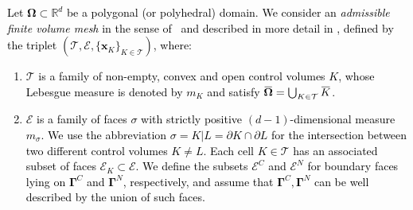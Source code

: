 \documentclass[10pt,a4paper, final]{article}
\newcommand{\reviewerTwo}[1]{\textcolor{black}{#1}}
\newcommand{\overbar}[1]{\mkern 1.5mu\overline{\mkern-1.5mu#1\mkern-1.5mu}\mkern 1.5mu}
\theoremstyle{definition}								%
\numberwithin{equation}{section}
\numberwithin{figure}{section}
\numberwithin{theorem}{section}
\begin{document}
\reviewerTwo{
    Let $\mathbf{\Omega} \subset \mathbb{R}^d$ be a polygonal (or polyhedral) domain. We consider an \emph{admissible finite volume mesh} in the sense of~\cite{Eymard.2000} and described in more detail in \cite{Abdel2024Thesis, Abdel2023Existence}, defined by the triplet $(\mathcal{T}, \mathcal{E}, \{\mathbf{x}_K\}_{K \in \mathcal{T}})$, where:
    \begin{enumerate}
        \item $\mathcal{T}$ is a family of non-empty, convex and open control volumes $K$, whose Lebesgue measure is denoted by $m_K$ and satisfy $ \mathbf{\overbar{\Omega}} = \bigcup_{K \in \mathcal{T}} \overbar{K}$.
        \item $\mathcal{E}$ is a family of faces $\sigma$ with strictly positive $(d-1)$-dimensional measure $m_\sigma $.
        We use the abbreviation $\sigma = K | L = \partial K \cap \partial L$ for the intersection between two different control volumes $K \neq L$.
        Each cell $K \in \mathcal{T}$ has an associated subset of faces $\mathcal{E}_K \subset \mathcal{E}$.
        We define the subsets $\mathcal{E}^C$ and $\mathcal{E}^N$ for boundary faces lying on $\boldsymbol{\Gamma}^C$ and $\boldsymbol{\Gamma}^N$, respectively, and assume that $\mathbf{\Gamma}^C, \mathbf{\Gamma}^N$ can be well described by the union of such faces.

\end{enumerate}}
\end{document}
